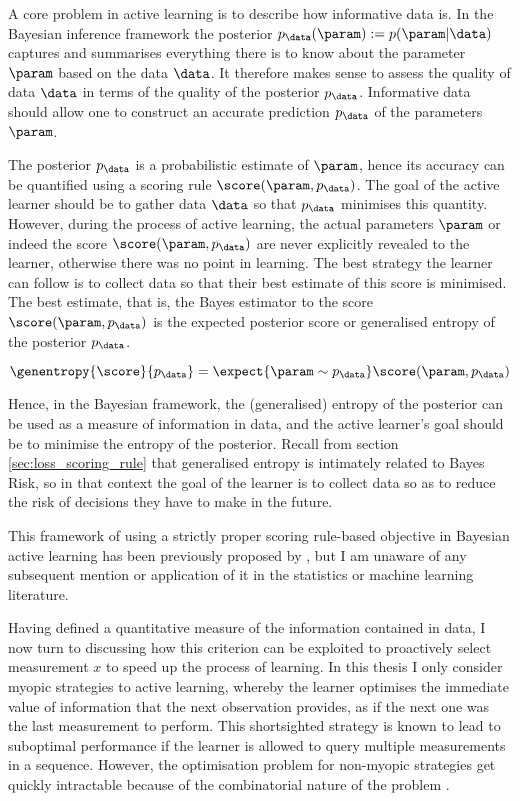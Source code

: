 A core problem in active learning is to describe how informative data is. In the Bayesian inference framework the posterior $p_\data(\param) := p(\param\vert\data)$ captures and summarises everything there is to know about the parameter $\param$ based on the data $\data$. It therefore makes sense to assess the quality of data $\data$ in terms of the quality of the posterior $p_\data$. Informative data should allow one to construct an accurate prediction $p_\data$ of the parameters $\param$.

The posterior $p_\data$ is a probabilistic estimate of $\param$, hence its accuracy can be quantified using a scoring rule $\score(\param,p_\data)$. The goal of the active learner should be to gather data $\data$ so that $p_\data$ minimises this quantity. However, during the process of active learning, the actual parameters $\param$ or indeed the score $\score(\param,p_\data)$ are never explicitly revealed to the learner, otherwise there was no point in learning. The best strategy the learner can follow is to collect data so that their best estimate of this score is minimised. The best estimate, that is, the Bayes estimator to the score $\score(\param,p_\data)$ is the expected posterior score or generalised entropy of the posterior $p_\data$.

\begin{equation}
	\genentropy{\score}{p_\data} = \expect{\param\sim p_\data} \score(\param,p_\data)
\end{equation}

Hence, in the Bayesian framework, the (generalised) entropy of the posterior can be used as a measure of information in data, and the active learner's goal should be to minimise the entropy of the posterior. Recall from section \ref{sec:loss_scoring_rule} that generalised entropy is intimately related to Bayes Risk, so in that context the goal of the learner is to collect data so as to reduce the risk of decisions they have to make in the future.

This framework of using a strictly proper scoring rule-based objective in Bayesian active learning has been previously proposed by \citet{Dawid1994}, but I am unaware of any subsequent mention or application of it in the statistics or machine learning literature.

Having defined a quantitative measure of the information contained in data, I now turn to discussing how this criterion can be exploited to proactively select measurement $x$ to speed up the process of learning. In this thesis I only consider myopic strategies to active learning, whereby the learner optimises the immediate value of information that the next observation provides, as if the next one was the last measurement to perform. This shortsighted strategy is known to lead to suboptimal performance if the learner is allowed to query multiple measurements in a sequence. However, the optimisation problem for non-myopic strategies get quickly intractable because of the combinatorial nature of the problem \citep{Krause2007}.

